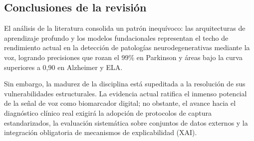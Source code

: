 \subsection{Conclusiones de la revisión}
El análisis de la literatura consolida un patrón inequívoco: las arquitecturas de aprendizaje profundo y los modelos fundacionales representan el techo de rendimiento actual en la detección de patologías neurodegenerativas mediante la voz, logrando precisiones que rozan el 99\% en Parkinson y áreas bajo la curva superiores a 0,90 en Alzheimer y ELA. 

Sin embargo, la madurez de la disciplina está supeditada a la resolución de sus vulnerabilidades estructurales. La evidencia actual ratifica el inmenso potencial de la señal de voz como biomarcador digital; no obstante, el avance hacia el diagnóstico clínico real exigirá la adopción de protocolos de captura estandarizados, la evaluación sistemática sobre conjuntos de datos externos y la integración obligatoria de mecanismos de explicabilidad (XAI).